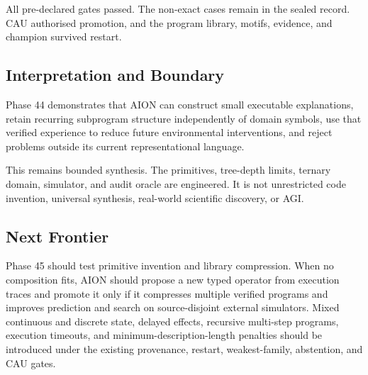 All pre-declared gates passed. The non-exact cases remain in the sealed record.
CAU authorised promotion, and the program library, motifs, evidence, and
champion survived restart.

\subsection{Interpretation and Boundary}

Phase 44 demonstrates that AION can construct small executable explanations,
retain recurring subprogram structure independently of domain symbols, use
that verified experience to reduce future environmental interventions, and
reject problems outside its current representational language.

This remains bounded synthesis. The primitives, tree-depth limits, ternary
domain, simulator, and audit oracle are engineered. It is not unrestricted
code invention, universal synthesis, real-world scientific discovery, or AGI.

\subsection{Next Frontier}

Phase 45 should test primitive invention and library compression. When no
composition fits, AION should propose a new typed operator from execution
traces and promote it only if it compresses multiple verified programs and
improves prediction and search on source-disjoint external simulators.
Mixed continuous and discrete state, delayed effects, recursive multi-step
programs, execution timeouts, and minimum-description-length penalties should
be introduced under the existing provenance, restart, weakest-family,
abstention, and CAU gates.
